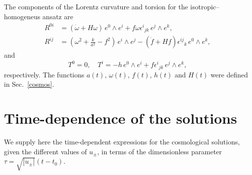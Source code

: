 \documentclass[aps,prd,12pt,superscriptaddress,showpacs,showkeys,longbibliography,reprint,nofootinbib]{revtex4-1}
\begin{document}
The components of the Lorentz curvature and torsion for the isotropic--homogeneus ansatz are 
\begin{align*}
  R^{0i}&=\left(\dot{\omega}+H\omega\right) \, e^0\wedge e^i+f\omega\epsilon^i{}_{jk} \, e^j\wedge e^k,\\
  R^{ij}&=\left(\omega^2+\tfrac{k}{a^2}-f^2\right) \, e^i\wedge e^j
  -\left(\dot{f}+Hf\right)\epsilon^{ij}{}_{k} \, e^0\wedge e^k,
\end{align*}
and 
\begin{equation}\label{homotorsion}
  T^0=0,\quad T^i=-h \, e^0\wedge e^i+f\epsilon^i{}_{jk} \, e^j\wedge e^k,
\end{equation}
respectively. The functions $a(t)$, $\omega(t)$, $f(t)$, $h(t)$ and $H(t)$ were defined in Sec.~\ref{cosmos}.

\section{Time-dependence of the solutions\label{solutions t}}

We supply here the time-dependent expressions for the cosmological solutions, given the different values of $u_\pm$, in terms of the dimensionless parameter \mbox{$\tau=\sqrt{|u_\pm|}(t-t_0)$}.
\vspace{.1cm}
\end{document}
